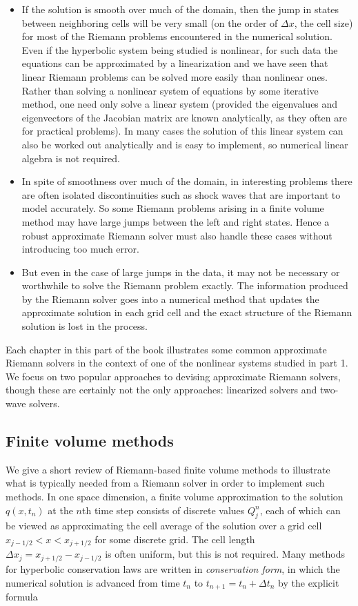 \documentclass[11pt]{article}
\begin{document}
\begin{itemize}
\item
  If the solution is smooth over much of the domain, then the jump in
  states between neighboring cells will be very small (on the order of
  \(\Delta x\), the cell size) for most of the Riemann problems
  encountered in the numerical solution. Even if the hyperbolic system
  being studied is nonlinear, for such data the equations can be
  approximated by a linearization and we have seen that linear Riemann
  problems can be solved more easily than nonlinear ones. Rather than
  solving a nonlinear system of equations by some iterative method, one
  need only solve a linear system (provided the eigenvalues and
  eigenvectors of the Jacobian matrix are known analytically, as they
  often are for practical problems). In many cases the solution of this
  linear system can also be worked out analytically and is easy to
  implement, so numerical linear algebra is not required.
\item
  In spite of smoothness over much of the domain, in interesting
  problems there are often isolated discontinuities such as shock waves
  that are important to model accurately. So some Riemann problems
  arising in a finite volume method may have large jumps between the
  left and right states. Hence a robust approximate Riemann solver must
  also handle these cases without introducing too much error.
\item
  But even in the case of large jumps in the data, it may not be
  necessary or worthwhile to solve the Riemann problem exactly. The
  information produced by the Riemann solver goes into a numerical
  method that updates the approximate solution in each grid cell and the
  exact structure of the Riemann solution is lost in the process.
\end{itemize}

    Each chapter in this part of the book illustrates some common
approximate Riemann solvers in the context of one of the nonlinear
systems studied in part 1. We focus on two popular approaches to
devising approximate Riemann solvers, though these are certainly not the
only approaches: linearized solvers and two-wave solvers.

    \hypertarget{finite-volume-methods}{%
\subsection{Finite volume methods}\label{finite-volume-methods}}

We give a short review of Riemann-based finite volume methods to
illustrate what is typically needed from a Riemann solver in order to
implement such methods. In one space dimension, a finite volume
approximation to the solution \(q(x,t_n)\) at the \(n\)th time step
consists of discrete values \(Q_j^n\), each of which can be viewed as
approximating the cell average of the solution over a grid cell
\(x_{j-1/2} < x < x_{j+1/2}\) for some discrete grid. The cell length
\(\Delta x_j = x_{j+1/2} - x_{j-1/2}\) is often uniform, but this is not
required. Many methods for hyperbolic conservation laws are written in
\emph{conservation form}, in which the numerical solution is advanced
from time \(t_n\) to \(t_{n+1} = t_n + \Delta t_n\) by the explicit
formula
\end{document}

